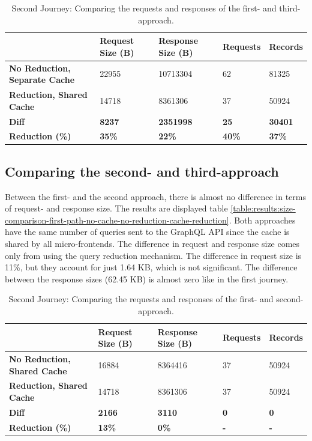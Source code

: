 \ifshowTables
\begin{table}[H]
  \begin{tabular}{|l|l|l|l|l|}
  \hline
  & \textbf{Request Size (B)} & \textbf{Response Size (B)} & \textbf{Requests} & \textbf{Records} \\
  \hline
  \textbf{No Reduction, Separate Cache} & 22955 & 10713304 & 62 & 81325 \\
  \hline
  \textbf{Reduction, Shared Cache} & 14718 & 8361306 & 37 & 50924 \\
  \hline
  \hline
  \textbf{Diff} & \textbf{8237} & \textbf{2351998} & \textbf{25} & \textbf{30401} \\
  \hline
  \textbf{Reduction (\%)} & \textbf{35\%} & \textbf{22\%} & \textbf{40\%} & \textbf{37\%} \\
  \hline
  \end{tabular}
  \caption{Second Journey: Comparing the requests and responses of the first- and third-approach.}\label{table:results:size-comparison-second-path-no-cache-no-reduction-cache-reduction}
\end{table}
\fi

\subsection{Comparing the second- and third-approach}\label{subsection:results:comparison-second-path-first-third-approach}

Between the first- and the second approach, there is almost no difference in terms of request- and response size. The results are displayed table \ref{table:results:size-comparison-first-path-no-cache-no-reduction-cache-reduction}. Both approaches have the same number of queries sent to the GraphQL \ac{API} since the cache is shared by all micro-frontends. The difference in request and response size comes only from using the query reduction mechanism. The difference in request size is 11\%, but they account for just 1.64 KB, which is not significant. The difference between the response sizes (62.45 KB) is almost zero like in the first journey.

\ifshowTables
\begin{table}[H]
\begin{tabular}{|l|l|l|l|l|}
  \hline
  & \textbf{Request Size (B)} & \textbf{Response Size (B)} & \textbf{Requests} & \textbf{Records} \\
  \hline
  \textbf{No Reduction, Shared Cache} & 16884 & 8364416 & 37 & 50924 \\
  \hline
  \textbf{Reduction, Shared Cache} & 14718 & 8361306 & 37 & 50924 \\
  \hline
  \hline
  \textbf{Diff} & \textbf{2166} & \textbf{3110} & \textbf{0} & \textbf{0} \\
  \hline
  \textbf{Reduction (\%)} & \textbf{13\%} & \textbf{0\%} & \textbf{-} & \textbf{-} \\
  \hline
  \end{tabular}
  \caption{Second Journey: Comparing the requests and responses of the first- and second-approach.}\label{table:results:size-comparison-second-path-no-cache-no-reduction-cache-no-reduction}
\end{table}
\fi